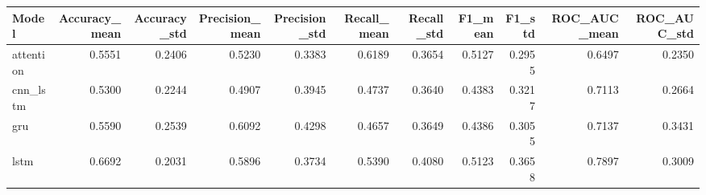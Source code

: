 \begin{tabular}{lrrrrrrrrrr}
\toprule
Model & Accuracy_mean & Accuracy_std & Precision_mean & Precision_std & Recall_mean & Recall_std & F1_mean & F1_std & ROC_AUC_mean & ROC_AUC_std \\
\midrule
attention & 0.5551 & 0.2406 & 0.5230 & 0.3383 & 0.6189 & 0.3654 & 0.5127 & 0.2955 & 0.6497 & 0.2350 \\
cnn_lstm & 0.5300 & 0.2244 & 0.4907 & 0.3945 & 0.4737 & 0.3640 & 0.4383 & 0.3217 & 0.7113 & 0.2664 \\
gru & 0.5590 & 0.2539 & 0.6092 & 0.4298 & 0.4657 & 0.3649 & 0.4386 & 0.3055 & 0.7137 & 0.3431 \\
lstm & 0.6692 & 0.2031 & 0.5896 & 0.3734 & 0.5390 & 0.4080 & 0.5123 & 0.3658 & 0.7897 & 0.3009 \\
\bottomrule
\end{tabular}
